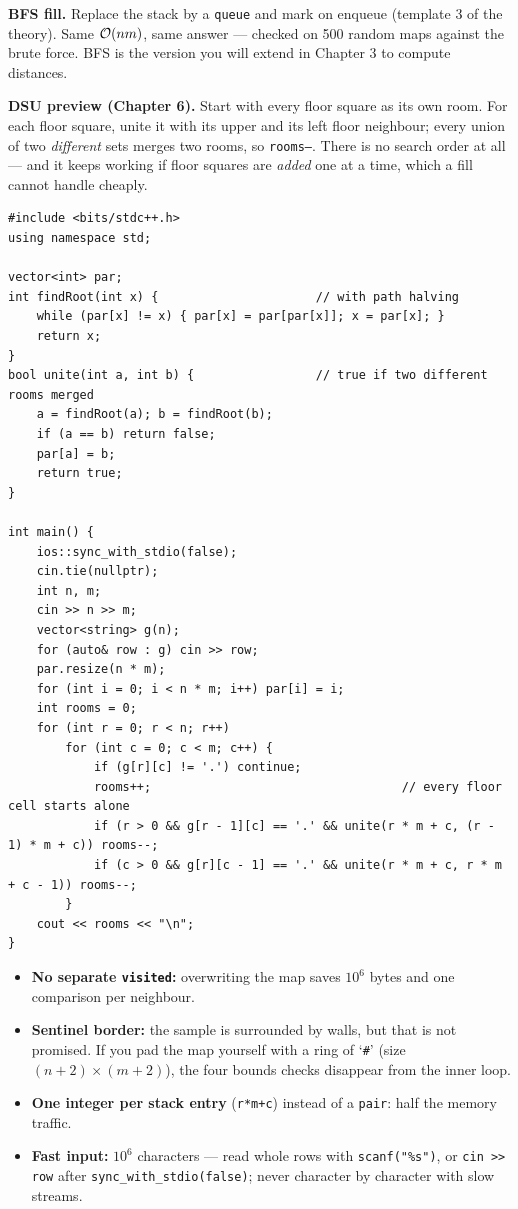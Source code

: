 \begin{alternativebox}
\textbf{BFS fill.} Replace the stack by a \texttt{queue} and mark on enqueue (template 3 of the theory). Same $\mathcal{O}(nm)$, same answer --- checked on 500 random maps against the brute force. BFS is the version you will extend in Chapter 3 to compute distances.

\textbf{DSU preview (Chapter 6).} Start with every floor square as its own room. For each floor square, unite it with its upper and its left floor neighbour; every union of two \emph{different} sets merges two rooms, so \texttt{rooms--}. There is no search order at all --- and it keeps working if floor squares are \emph{added} one at a time, which a fill cannot handle cheaply.
\begin{lstlisting}[style=cpp]
#include <bits/stdc++.h>
using namespace std;

vector<int> par;
int findRoot(int x) {                      // with path halving
    while (par[x] != x) { par[x] = par[par[x]]; x = par[x]; }
    return x;
}
bool unite(int a, int b) {                 // true if two different rooms merged
    a = findRoot(a); b = findRoot(b);
    if (a == b) return false;
    par[a] = b;
    return true;
}

int main() {
    ios::sync_with_stdio(false);
    cin.tie(nullptr);
    int n, m;
    cin >> n >> m;
    vector<string> g(n);
    for (auto& row : g) cin >> row;
    par.resize(n * m);
    for (int i = 0; i < n * m; i++) par[i] = i;
    int rooms = 0;
    for (int r = 0; r < n; r++)
        for (int c = 0; c < m; c++) {
            if (g[r][c] != '.') continue;
            rooms++;                                   // every floor cell starts alone
            if (r > 0 && g[r - 1][c] == '.' && unite(r * m + c, (r - 1) * m + c)) rooms--;
            if (c > 0 && g[r][c - 1] == '.' && unite(r * m + c, r * m + c - 1)) rooms--;
        }
    cout << rooms << "\n";
}
\end{lstlisting}
\end{alternativebox}

\begin{tricksbox}
\begin{itemize}[leftmargin=*]
    \item \textbf{No separate \texttt{visited}:} overwriting the map saves $10^6$ bytes and one comparison per neighbour.
    \item \textbf{Sentinel border:} the sample is surrounded by walls, but that is not promised. If you pad the map yourself with a ring of `\texttt{\#}' (size $(n+2)\times(m+2)$), the four bounds checks disappear from the inner loop.
    \item \textbf{One integer per stack entry} (\texttt{r*m+c}) instead of a \texttt{pair}: half the memory traffic.
    \item \textbf{Fast input:} $10^6$ characters --- read whole rows with \texttt{scanf("\%s")}, or \texttt{cin >> row} after \texttt{sync\_with\_stdio(false)}; never character by character with slow streams.
\end{itemize}
\end{tricksbox}

